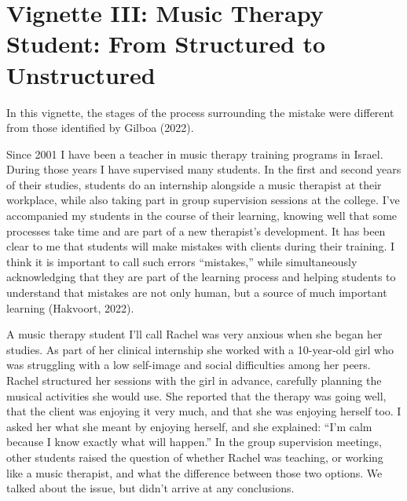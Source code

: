 \documentclass[authordate, empirical, issue]{jote-new-article}
\begin{document}
\section{Vignette III: Music Therapy Student: From Structured to Unstructured}



In this vignette, the stages of the process surrounding the mistake were different from those identified by Gilboa (2022).



Since 2001 I have been a teacher in music therapy training programs in Israel. During those years I have supervised many students. In the first and second years of their studies, students do an internship alongside a music therapist at their workplace, while also taking part in group supervision sessions at the college. I've accompanied my students in the course of their learning, knowing well that some processes take time and are part of a new therapist's development. It has been clear to me that students will make mistakes with clients during their training. I think it is important to call such errors “mistakes,” while simultaneously acknowledging that they are part of the learning process and helping students to understand that mistakes are not only human, but a source of much important learning (Hakvoort, 2022).



A music therapy student I'll call Rachel was very anxious when she began her studies. As part of her clinical internship she worked with a 10-year-old girl who was struggling with a low self-image and social difficulties among her peers. Rachel structured her sessions with the girl in advance, carefully planning the musical activities she would use. She reported that the therapy was going well, that the client was enjoying it very much, and that she was enjoying herself too. I asked her what she meant by enjoying herself, and she explained: “I'm calm because I know exactly what will happen.” In the group supervision meetings, other students raised the question of whether Rachel was teaching, or working like a music therapist, and what the difference between those two options. We talked about the issue, but didn't arrive at any conclusions.
\end{document}
